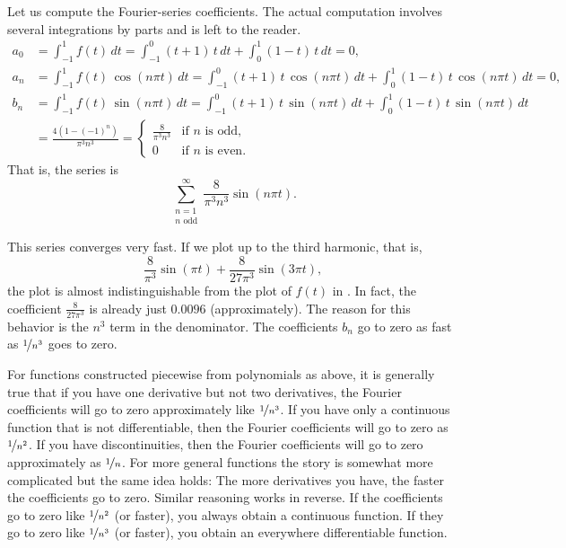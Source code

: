 \begin{example}
Let us compute the Fourier-series coefficients.  The actual computation
involves several integrations by parts and is left to the reader.
\begin{align*}
a_0 & = 
\int_{-1}^1
f(t) \, dt = 
\int_{-1}^0
(t+1)\,t \, dt +
\int_0^1
(1-t)\,t \, dt = 0 , \\
a_n & = 
\int_{-1}^1
f(t) \, \cos (n\pi t) \, dt = 
\int_{-1}^0
(t+1)\,t
\, \cos (n \pi t) \, dt +
\int_0^1
(1-t)\,t
\, \cos (n \pi t) \, dt = 0, \\
b_n & = 
\int_{-1}^1
f(t) \, \sin (n\pi t) \, dt = 
\int_{-1}^0
(t+1)\,t
\, \sin (n \pi t) \, dt +
\int_0^1
(1-t)\,t
\, \sin (n \pi t) \, dt \\
& =
\frac{4 ( 1-{(-1)}^n)}{\pi^3 n^3} 
=
\begin{cases}
\frac{8}{\pi^3 n^3} & \text{if } n \text{ is odd} , \\
0 & \text{if } n \text{ is even} .
\end{cases}
\end{align*}
That is, the series is
\begin{equation*}
\sum_{\substack{n=1 \\ n \text{ odd}}}^\infty \frac{8}{\pi^3 n^3} \sin (n \pi t) .
\end{equation*}

This series converges very fast.
If we plot up
to the third harmonic, that is,
\begin{equation*}
\frac{8}{\pi^3} \sin (\pi t) + 
\frac{8}{27 \pi^3} \sin (3 \pi t) ,
\end{equation*}
the plot is almost indistinguishable from the plot of $f(t)$ in
.
In fact, the coefficient 
$\frac{8}{27 \pi^3}$ is already just $0.0096$ (approximately).
The reason for this behavior is the $n^3$ term in the denominator.
The coefficients $b_n$ go to zero as fast as
$\nicefrac{1}{n^3}$ goes to
zero.
\end{example}

For functions constructed piecewise from polynomials as above,
it is generally true that
if you have one derivative but not two derivatives,
the Fourier
coefficients will go to zero approximately like $\nicefrac{1}{n^3}$.
If you
have only a continuous function that is not differentiable,
then the Fourier coefficients will go to
zero as $\nicefrac{1}{n^2}$.  If you have discontinuities, then 
the Fourier coefficients will go to zero approximately as $\nicefrac{1}{n}$.
For more general functions the story is somewhat more complicated but the
same idea holds: The more derivatives you have, the faster the coefficients
go to zero.  Similar reasoning works in reverse.  If the coefficients go to
zero like $\nicefrac{1}{n^2}$ (or faster),
you always obtain a continuous function.  If
they go to zero like $\nicefrac{1}{n^3}$ (or faster),
you obtain an everywhere differentiable
function.

